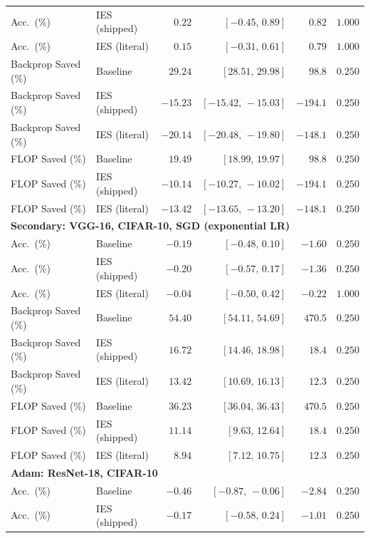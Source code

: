 \documentclass{article}
\newcommand{\win}[1]{\cellcolor{tgwin}#1}
\newcommand{\lose}[1]{\cellcolor{tglose}#1}
\theoremstyle{plain}
\theoremstyle{definition}
\theoremstyle{remark}
\begin{document}
\begin{longtable}{llrrrr}
Acc.\ (\%) & IES (shipped) & \win{$0.22$} & $[-0.45,\,0.89]$ & $0.82$ & $1.000$ \\
Acc.\ (\%) & IES (literal) & \win{$0.15$} & $[-0.31,\,0.61]$ & $0.79$ & $1.000$ \\
Backprop Saved (\%) & Baseline & \win{$29.24$} & $[28.51,\,29.98]$ & $98.8$ & $0.250$ \\
Backprop Saved (\%) & IES (shipped) & \lose{$-15.23$} & $[-15.42,\,-15.03]$ & $-194.1$ & $0.250$ \\
Backprop Saved (\%) & IES (literal) & \lose{$-20.14$} & $[-20.48,\,-19.80]$ & $-148.1$ & $0.250$ \\
FLOP Saved (\%) & Baseline & \win{$19.49$} & $[18.99,\,19.97]$ & $98.8$ & $0.250$ \\
FLOP Saved (\%) & IES (shipped) & \lose{$-10.14$} & $[-10.27,\,-10.02]$ & $-194.1$ & $0.250$ \\
FLOP Saved (\%) & IES (literal) & \lose{$-13.42$} & $[-13.65,\,-13.20]$ & $-148.1$ & $0.250$ \\
\midrule
\multicolumn{6}{l}{\textbf{Secondary: VGG-16, CIFAR-10, SGD (exponential LR)}} \\
\midrule
Acc.\ (\%) & Baseline & \lose{$-0.19$} & $[-0.48,\,0.10]$ & $-1.60$ & $0.250$ \\
Acc.\ (\%) & IES (shipped) & \lose{$-0.20$} & $[-0.57,\,0.17]$ & $-1.36$ & $0.250$ \\
Acc.\ (\%) & IES (literal) & \lose{$-0.04$} & $[-0.50,\,0.42]$ & $-0.22$ & $1.000$ \\
Backprop Saved (\%) & Baseline & \win{$54.40$} & $[54.11,\,54.69]$ & $470.5$ & $0.250$ \\
Backprop Saved (\%) & IES (shipped) & \win{$16.72$} & $[14.46,\,18.98]$ & $18.4$ & $0.250$ \\
Backprop Saved (\%) & IES (literal) & \win{$13.42$} & $[10.69,\,16.13]$ & $12.3$ & $0.250$ \\
FLOP Saved (\%) & Baseline & \win{$36.23$} & $[36.04,\,36.43]$ & $470.5$ & $0.250$ \\
FLOP Saved (\%) & IES (shipped) & \win{$11.14$} & $[9.63,\,12.64]$ & $18.4$ & $0.250$ \\
FLOP Saved (\%) & IES (literal) & \win{$8.94$} & $[7.12,\,10.75]$ & $12.3$ & $0.250$ \\
\midrule
\multicolumn{6}{l}{\textbf{Adam: ResNet-18, CIFAR-10}} \\
\midrule
Acc.\ (\%) & Baseline & \lose{$-0.46$} & $[-0.87,\,-0.06]$ & $-2.84$ & $0.250$ \\
Acc.\ (\%) & IES (shipped) & \lose{$-0.17$} & $[-0.58,\,0.24]$ & $-1.01$ & $0.250$ \\

\end{longtable}
\end{document}
